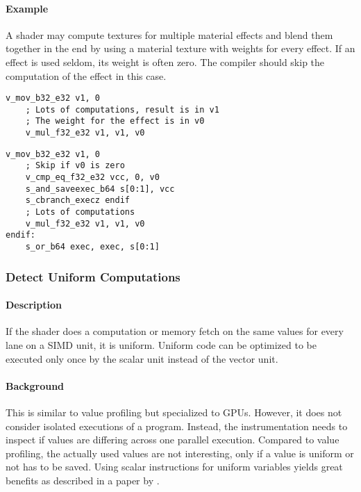 \paragraph{Example} A shader may compute textures for multiple material effects and blend them together in the end by using a material texture with weights for every effect.
If an effect is used seldom, its weight is often zero. The compiler should skip the computation of the effect in this case.\ \\
\begin{minipage}{.47\textwidth}
	\begin{lstlisting}[caption={Value Profiling --- unoptimized},frame=tlrb,language={[amdgpu]Assembler}]
	v_mov_b32_e32 v1, 0
	; Lots of computations, result is in v1
	; The weight for the effect is in v0
	v_mul_f32_e32 v1, v1, v0
	\end{lstlisting}
\end{minipage}\hfill
\begin{minipage}{.47\textwidth}
	\begin{lstlisting}[caption={Value Profiling --- optimized},frame=tlrb,language={[amdgpu]Assembler}]
	v_mov_b32_e32 v1, 0
	; Skip if v0 is zero
	v_cmp_eq_f32_e32 vcc, 0, v0
	s_and_saveexec_b64 s[0:1], vcc
	s_cbranch_execz endif
	; Lots of computations
	v_mul_f32_e32 v1, v1, v0
endif:
	s_or_b64 exec, exec, s[0:1]
	\end{lstlisting}
\end{minipage}

\subsubsection{Detect Uniform Computations}
\paragraph{Description} If the shader does a computation or memory fetch on the same values for every lane on a SIMD unit, it is uniform. Uniform code can be optimized to be executed only once by the scalar unit instead of the vector unit.
\paragraph{Background} This is similar to value profiling but specialized to GPUs. However, it does not consider isolated executions of a program. Instead, the instrumentation needs to inspect if values are differing across one parallel execution. Compared to value profiling, the actually used values are not interesting, only if a value is uniform or not has to be saved. Using scalar instructions for uniform variables yields great benefits as described in a paper by \citet{Chen2016}.
